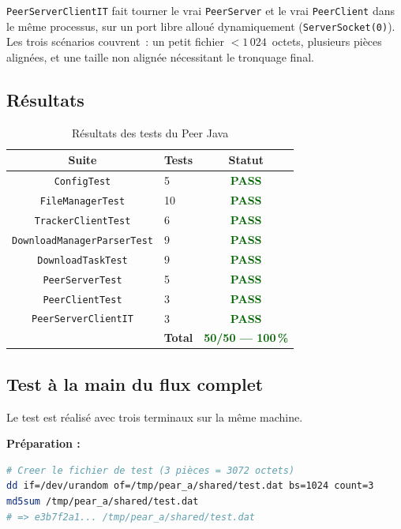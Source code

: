 \documentclass[11pt, a4paper]{article}
\begin{document}
\texttt{PeerServerClientIT} fait tourner le vrai \texttt{PeerServer} et
le vrai \texttt{PeerClient} dans le même processus, sur un port libre
alloué dynamiquement (\texttt{ServerSocket(0)}). Les trois scénarios
couvrent~: un petit fichier $< 1\,024$~octets, plusieurs pièces alignées,
et une taille non alignée nécessitant le tronquage final.

\subsection{Résultats}

\begin{table}[H]
\centering
\begin{tabular}{clc}
\toprule
\textbf{Suite} & \textbf{Tests} & \textbf{Statut} \\
\midrule
\texttt{ConfigTest}                 &  5 & \textcolor{darkgreen}{\textbf{PASS}} \\
\texttt{FileManagerTest}            & 10 & \textcolor{darkgreen}{\textbf{PASS}} \\
\texttt{TrackerClientTest}          &  6 & \textcolor{darkgreen}{\textbf{PASS}} \\
\texttt{DownloadManagerParserTest}  &  9 & \textcolor{darkgreen}{\textbf{PASS}} \\
\texttt{DownloadTaskTest}           &  9 & \textcolor{darkgreen}{\textbf{PASS}} \\
\texttt{PeerServerTest}             &  5 & \textcolor{darkgreen}{\textbf{PASS}} \\
\texttt{PeerClientTest}             &  3 & \textcolor{darkgreen}{\textbf{PASS}} \\
\texttt{PeerServerClientIT}         &  3 & \textcolor{darkgreen}{\textbf{PASS}} \\
\midrule
\multicolumn{2}{r}{\textbf{Total}} & \textcolor{darkgreen}{\textbf{50/50 --- 100\,\%}} \\
\bottomrule
\end{tabular}
\caption{Résultats des tests du Peer Java}
\end{table}

\subsection{Test à la main du flux complet}

Le test est réalisé avec trois terminaux sur la même machine.

\textbf{Préparation :}
\begin{lstlisting}[language=bash]
# Creer le fichier de test (3 pièces = 3072 octets)
dd if=/dev/urandom of=/tmp/pear_a/shared/test.dat bs=1024 count=3
md5sum /tmp/pear_a/shared/test.dat
# => e3b7f2a1... /tmp/pear_a/shared/test.dat
\end{lstlisting}
\end{document}
